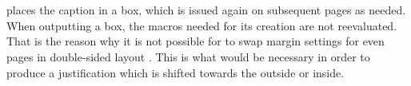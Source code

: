 \begin{Declaration}
  \\
  \\
\end{Declaration}
%
%
%
\begin{Explain}
   places the caption in a box, which is issued
  again on subsequent pages as needed. When outputting a box, the
  macros needed for its creation are not reevaluated. That is the
  reason why it is not possible for {\KOMAScript} to swap margin
  settings for even pages in double-sided layout . This is what would
  be necessary in order to produce a justification which is shifted
  towards the outside or inside.
\end{Explain}

